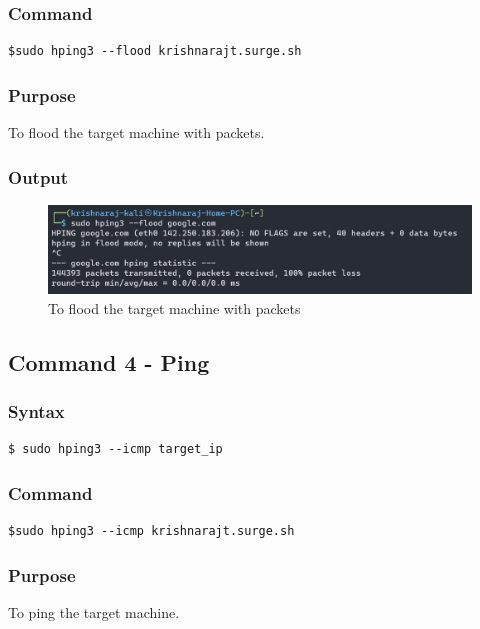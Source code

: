 \documentclass[11pt]{article}
\begin{document}
\subsubsection*{Command}
\begin{verbatim}
$sudo hping3 --flood krishnarajt.surge.sh
\end{verbatim}

\subsubsection*{Purpose}
To flood the target machine with packets.

\subsubsection*{Output}
\begin{figure}[H]
    \centering
    \includegraphics[width=1.0\textwidth]{hping flood.jpg}
    \caption{To flood the target machine with packets}
    \label{fig:3}
\end{figure}

\subsection{Command 4 - Ping}

\subsubsection*{Syntax}
\begin{verbatim}
$ sudo hping3 --icmp target_ip
\end{verbatim}

\subsubsection*{Command}
\begin{verbatim}
$sudo hping3 --icmp krishnarajt.surge.sh
\end{verbatim}

\subsubsection*{Purpose}
To ping the target machine.
\end{document}
